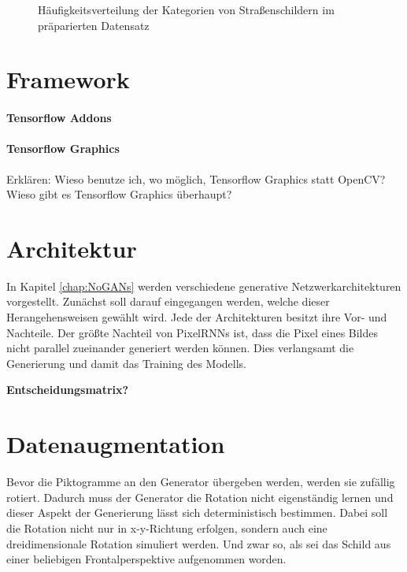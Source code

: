 \begin{figure}
\caption{Häufigkeitsverteilung der Kategorien von Straßenschildern im präparierten Datensatz}
\end{figure}

\section{Framework}
\paragraph{Tensorflow Addons}
\paragraph{Tensorflow Graphics}
Erklären: Wieso benutze ich, wo möglich, Tensorflow Graphics statt OpenCV? Wieso gibt es Tensorflow Graphics überhaupt?

\section{Architektur}
In Kapitel \ref{chap:NoGANs} werden verschiedene generative Netzwerkarchitekturen vorgestellt. Zunächst soll darauf eingegangen werden, welche dieser Herangehensweisen gewählt wird. Jede der Architekturen besitzt ihre Vor- und Nachteile. Der größte Nachteil von \acp{PixelRNN} ist, dass die Pixel eines Bildes nicht parallel zueinander generiert werden können. Dies verlangsamt die Generierung und damit das Training des Modells.

\textbf{Entscheidungsmatrix?}

\section{Datenaugmentation}
Bevor die Piktogramme an den Generator übergeben werden, werden sie zufällig rotiert. Dadurch muss der Generator die Rotation nicht eigenständig lernen und dieser Aspekt der Generierung lässt sich deterministisch bestimmen. Dabei soll die Rotation nicht nur in x-y-Richtung erfolgen, sondern auch eine dreidimensionale Rotation simuliert werden. Und zwar so, als sei das Schild aus einer beliebigen Frontalperspektive aufgenommen worden.

